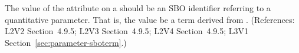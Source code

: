The value of the  attribute on a \Parameter should be an SBO
identifier referring to a quantitative parameter.  That is, the value 
be a term derived from \sboparameter.  (References: L2V2 Section~4.9.5; L2V3
Section~4.9.5; L2V4 Section~4.9.5; L3V1 Section~\ref{sec:parameter-sboterm}.)
